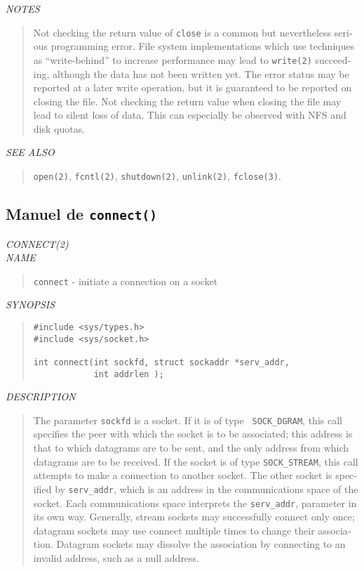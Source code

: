 \begin{appendix}
\begin{english}
{\sl NOTES}
\begin{quote}
	Not checking the return value of {\tt close} is a common but
	nevertheless serious programming error. File system
	implementations which use techniques as ``write-behind''
	to increase performance may lead to {\tt write(2)} succeeding,
	although the data has not been written yet. The error
	status may be reported at a later write operation, but it
	is guaranteed to be reported on closing the file. Not
	checking the return value when closing the file may lead
	to silent loss of data. This can especially be observed
	with NFS and disk quotas.
\end{quote}

{\sl SEE ALSO}
\begin{quote}
	{\tt open(2)}, {\tt fcntl(2)}, {\tt shutdown(2)}, {\tt unlink(2)},
	{\tt fclose(3)}.
\end{quote}
\end{english}

\subsection{Manuel de {\tt connect()}}
\begin{english}
{\sl CONNECT(2)}\\

{\sl NAME}
\begin{quote}
	{\tt connect} - initiate a connection on a socket
\end{quote}

{\sl SYNOPSIS}
\begin{quote}
\begin{verbatim}
#include <sys/types.h>
#include <sys/socket.h>

int connect(int sockfd, struct sockaddr *serv_addr,
            int addrlen );
\end{verbatim}
\end{quote}

{\sl DESCRIPTION}
\begin{quote}
	The parameter {\tt sockfd} is a socket. If it is of type {\tt
	SOCK\_DGRAM}, this call specifies the peer with which the socket
	is to be associated; this address is that to which datagrams are
	to be sent, and the only address from which datagrams are to be
	received. If the socket is of type {\tt SOCK\_STREAM}, this
	call attempts to make a connection to another socket. The other 
	socket is specified by {\tt serv\_addr}, which is an address in
	the communications space of the socket. Each communications space 
	interprets the {\tt serv\_addr}, parameter in its own way. 
	Generally, stream sockets may successfully connect only once;
	datagram sockets may use connect multiple times to change their
	association. Datagram sockets may dissolve the association by
	connecting to an invalid address, such as a null address.
\end{quote}


\end{english}
\end{appendix}
